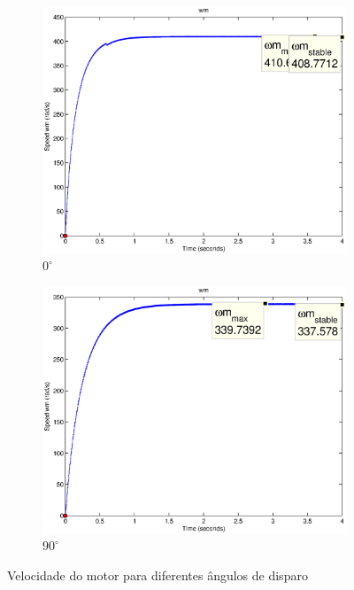 \documentclass{article}
\begin{document}
\begin{figure}[H]
	\centering
	\begin{subfigure}[b]{0.49\linewidth}
		\includegraphics[width=\linewidth]{matlab/wm9}
		\caption{$0^\circ$}
	\end{subfigure}
	\begin{subfigure}[b]{0.49\linewidth}
		\includegraphics[width=\linewidth]{matlab/wm10}
		\caption{$90^\circ$}
	\end{subfigure}
	\caption{Velocidade do motor para diferentes ângulos de disparo}
	\label{fig:res9}
\end{figure}
\end{document}
